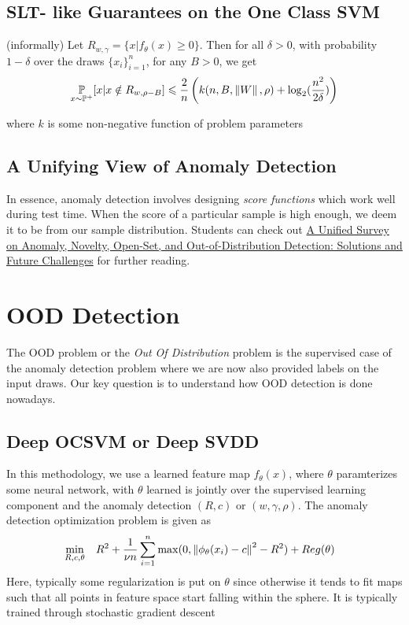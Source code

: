 \documentclass[11pt]{report}
\begin{document}
\subsection{SLT- like Guarantees on the One Class SVM}
\begin{theorem}
    (informally) Let \(R_{w,\gamma}=\{x | f_\theta(x) \geq 0\}\). Then for all \(\delta > 0 \), with probability \(1- \delta\) over the draws \(\{x_i\}_{i=1}^n\), for any \(B >0\), we get
    \begin{align}
        \underset{x \sim \mathbb{P}^+}{\mathbb{P}} [x | x \notin R_{w,\rho-B}] \leqslant \frac{2}{n}\left( k(n,B,\left\lVert W \right\rVert,\rho) + \log_2(\frac{n^2}{2\delta}) \right) \nonumber
    \end{align}
\end{theorem}
where \(k\) is some non-negative function of problem parameters

\subsection{A Unifying View of Anomaly Detection}
In essence, anomaly detection involves designing \emph{score functions} which work well during test time. When the score of a particular sample is high enough, we deem it to be from our sample distribution. Students can check out \href{https://arxiv.org/abs/2110.14051}{A Unified Survey on Anomaly, Novelty, Open-Set, and Out-of-Distribution Detection: Solutions and Future Challenges} for further reading.


\section{OOD Detection}
The OOD problem or the \emph{Out Of Distribution} problem is the supervised case of the anomaly detection problem where we are now also provided labels on the input draws. Our key question is to understand how OOD detection is done nowadays.

\subsection{Deep OCSVM or Deep SVDD}
In this methodology, we use a learned feature map \(f_\theta(x)\), where \(\theta\) paramterizes some neural network, with \(\theta\) learned is jointly over the supervised learning component and the anomaly detection \((R,c)\) or \((w,\gamma,\rho)\). The anomaly detection optimization problem is given as 
\begin{align}
    \begin{aligned}
    &\operatorname*{min}_{R,c,\theta}  && R^2+\frac{1}{\nu n}\sum_{i=1}^{n}\max (0,\left\lVert \phi_\theta(x_i)-c \right\rVert^2-R^2) + Reg(\theta)
    \end{aligned}  \nonumber
\end{align}
Here, typically some regularization is put on \(\theta\) since otherwise it tends to fit maps such that all points in feature space  start falling within the sphere. It is typically trained through stochastic gradient descent
\end{document}
